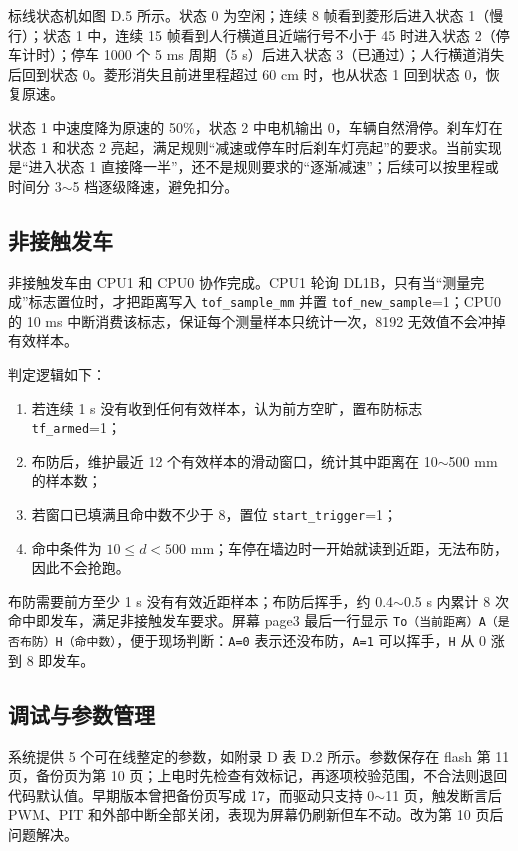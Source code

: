 \documentclass{MaiTechReport}
\begin{document}
标线状态机如图 D.5 所示。状态 0 为空闲；连续 8 帧看到菱形后进入状态 1（慢行）；状态 1 中，连续 15 帧看到人行横道且近端行号不小于 45 时进入状态 2（停车计时）；停车 1000 个 5 ms 周期（5 s）后进入状态 3（已通过）；人行横道消失后回到状态 0。菱形消失且前进里程超过 60 cm 时，也从状态 1 回到状态 0，恢复原速。



状态 1 中速度降为原速的 50\%，状态 2 中电机输出 0，车辆自然滑停。刹车灯在状态 1 和状态 2 亮起，满足规则“减速或停车时后刹车灯亮起”的要求。当前实现是“进入状态 1 直接降一半”，还不是规则要求的“逐渐减速”；后续可以按里程或时间分 3$\sim$5 档逐级降速，避免扣分。

\subsection{非接触发车}
非接触发车由 CPU1 和 CPU0 协作完成。CPU1 轮询 DL1B，只有当“测量完成”标志置位时，才把距离写入 \texttt{tof\_sample\_mm} 并置 \texttt{tof\_new\_sample}=1；CPU0 的 10 ms 中断消费该标志，保证每个测量样本只统计一次，8192 无效值不会冲掉有效样本。

判定逻辑如下：
\begin{enumerate}
  \item 若连续 1 s 没有收到任何有效样本，认为前方空旷，置布防标志 \texttt{tf\_armed}=1；
  \item 布防后，维护最近 12 个有效样本的滑动窗口，统计其中距离在 10$\sim$500 mm 的样本数；
  \item 若窗口已填满且命中数不少于 8，置位 \texttt{start\_trigger}=1；
  \item 命中条件为 $10\le d<500$ mm；车停在墙边时一开始就读到近距，无法布防，因此不会抢跑。
\end{enumerate}

布防需要前方至少 1 s 没有有效近距样本；布防后挥手，约 0.4$\sim$0.5 s 内累计 8 次命中即发车，满足非接触发车要求。屏幕 page3 最后一行显示 \texttt{To（当前距离）A（是否布防）H（命中数）}，便于现场判断：\texttt{A=0} 表示还没布防，\texttt{A=1} 可以挥手，\texttt{H} 从 0 涨到 8 即发车。

\subsection{调试与参数管理}
系统提供 5 个可在线整定的参数，如附录 D 表 D.2 所示。参数保存在 flash 第 11 页，备份页为第 10 页；上电时先检查有效标记，再逐项校验范围，不合法则退回代码默认值。早期版本曾把备份页写成 17，而驱动只支持 0$\sim$11 页，触发断言后 PWM、PIT 和外部中断全部关闭，表现为屏幕仍刷新但车不动。改为第 10 页后问题解决。
\end{document}
